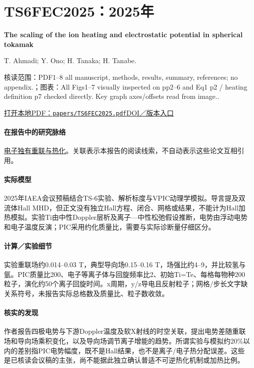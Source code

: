 \documentclass[UTF8,a4paper,11pt,openany,fontset=fandol]{ctexbook}
\begin{document}
\section{TS6FEC2025：2025年}\label{paper:TS6FEC2025}

\textbf{The scaling of the ion heating and electrostatic potential in spherical tokamak}\citep{TS6FEC2025}\

T. Ahmadi;  Y. Ono;  H. Tanaka;  H. Tanabe.

\textsf{核读范围：}PDF1–8 all manuscript,  methods,  results,  summary,  references;  no appendix.；\textsf{图表：}All Figs1–7 visually inspected on pp2–6 and Eq1 p2 / heating definition p7 checked directly. Key graph axes/offsets read from image..

\href{run:../papers/TS6FEC2025.pdf}{打开本地PDF：\texttt{papers/TS6FEC2025.pdf}}\quad\href{https://conferences.iaea.org/event/392/papers/35991/}{DOI／版本入口}

\paragraph{在报告中的研究脉络}\hyperref[story:energy]{电子独有重联与热化}。关联表示本报告的阅读线索，不自动表示这些论文互相引用。

\paragraph{实际模型}2025年IAEA会议预稿结合TS-6实验、解析标度与VPIC动理学模拟。导言提及双流体Hall MHD，但正文没有独立Hall方程、闭合、网格或结果，不能计为Hall加热模拟。实验Ti由中性Doppler层析及离子—中性松弛假设推断，电势由浮动电势和电子温度反演；PIC采用约化质量比，需要与实际诊断量仔细区分。

\paragraph{计算／实验细节}实验重联场约0.014–0.03 T，典型导向场0.15–0.16 T，场强比约4–9，并比较氢与氩。PIC质量比200、电子等离子体与回旋频率比2、初始Ti=Te、每格每物种200粒子，演化约50个离子回旋时间。x周期，y/z导电且反射粒子；网格/步长文字缺关系符号，未报告实际总格数及质量比、粒子数收敛。

\paragraph{核实的发现}作者报告四极电势与下游Doppler温度及软X射线的时空关联，提出电势差随重联场和导向场乘积变化，以及导向场调节离子增能的趋势。所谓实验与模拟约20\%以内的差别指PIC电势幅度，既不是Hall结果，也不是离子/电子热分配误差。这些是已核读会议稿的主张，尚不能据此独立确认普适不可逆热化机制或加热比例。
\end{document}
